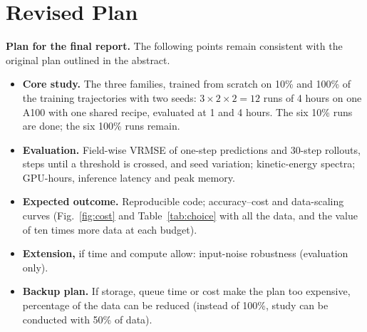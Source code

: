 \documentclass[11pt]{article}
\begin{document}
\newpage
\section{Revised Plan}
\label{sec:plan}

\textbf{Plan for the final report.} The following points remain consistent with the original plan outlined in the abstract.
\begin{itemize}
    \item \textbf{Core study.} The three families, trained from scratch on 10\% and 100\% of the training
    trajectories with two seeds: $3\times2\times2=12$ runs of 4 hours on one A100 with one shared recipe, evaluated
    at 1 and 4 hours. The six 10\% runs are done; the six 100\% runs remain.
    \item \textbf{Evaluation.} Field-wise VRMSE of one-step predictions and 30-step rollouts, steps until a
    threshold is crossed, and seed variation; kinetic-energy spectra; GPU-hours, inference latency and peak memory.
    \item \textbf{Expected outcome.} Reproducible code; accuracy--cost and data-scaling curves (Fig.~\ref{fig:cost}
    and Table~\ref{tab:choice} with all the data, and the value of ten times more data at each budget).
    \item \textbf{Extension,} if time and compute allow: input-noise robustness (evaluation only).
    \item \textbf{Backup plan.} If storage, queue time or cost make the plan too expensive, percentage of the data can be reduced (instead of 100\%, study can be conducted with 50\% of data).
\end{itemize}
\end{document}
